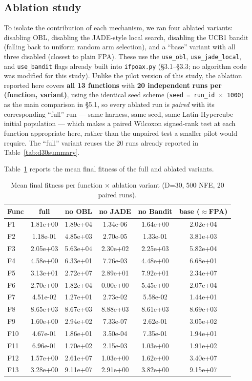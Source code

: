 \documentclass[preprint,12pt]{elsarticle}
\begin{document}
\subsection{Ablation study}
\label{subsec5-4}
To isolate the contribution of each mechanism, we ran four ablated variants: disabling OBL, disabling the JADE-style local search, disabling the UCB1 bandit (falling back to uniform random arm selection), and a ``base'' variant with all three disabled (closest to plain FPA). These use the \texttt{use\_obl}, \texttt{use\_jade\_local}, and \texttt{use\_bandit} flags already built into \texttt{ifpoax.py} (\S3.1--\S3.3; no algorithm code was modified for this study). Unlike the pilot version of this study, the ablation reported here covers \textbf{all 13 functions} with \textbf{20 independent runs per (function, variant)}, using the identical seed scheme (\texttt{seed = run\_id $\times$ 1000}) as the main comparison in \S5.1, so every ablated run is \emph{paired} with its corresponding ``full'' run --- same harness, same seed, same Latin-Hypercube initial population --- which makes a paired Wilcoxon signed-rank test at each function appropriate here, rather than the unpaired test a smaller pilot would require. The ``full'' variant reuses the 20 runs already reported in Table~\ref{tab:d30summary}.

Table~\ref{tab:ablation} reports the mean final fitness of the full and ablated variants.

\begin{table}[htbp]
\centering
\footnotesize
\caption{Mean final fitness per function $\times$ ablation variant (D=30, 500 NFE, 20 paired runs).}
\label{tab:ablation}
\begin{tabular}{lccccc}
\hline
Func & full & no OBL & no JADE & no Bandit & base ($\approx$FPA) \\
\hline
F1  & 1.81e+00 & 1.89e+04 & 1.34e-06 & 1.64e+00 & 2.02e+04 \\
F2  & 1.18e-01 & 4.85e+03 & 2.70e-05 & 1.33e-01 & 3.81e+03 \\
F3  & 2.05e+03 & 5.63e+04 & 2.30e+02 & 2.25e+03 & 5.82e+04 \\
F4  & 4.58e+00 & 6.33e+01 & 7.76e-03 & 4.48e+00 & 6.68e+01 \\
F5  & 3.13e+01 & 2.72e+07 & 2.89e+01 & 7.92e+01 & 2.34e+07 \\
F6  & 2.70e+00 & 1.82e+04 & 0.00e+00 & 5.45e+00 & 2.07e+04 \\
F7  & 4.51e-02 & 1.27e+01 & 2.73e-02 & 5.58e-02 & 1.44e+01 \\
F8  & 8.65e+03 & 8.67e+03 & 8.88e+03 & 8.61e+03 & 8.69e+03 \\
F9  & 1.60e+00 & 2.94e+02 & 7.33e-07 & 2.62e-01 & 3.05e+02 \\
F10 & 4.67e-01 & 1.86e+01 & 3.50e-04 & 7.35e-01 & 1.94e+01 \\
F11 & 6.96e-01 & 1.70e+02 & 2.15e-03 & 1.03e+00 & 1.91e+02 \\
F12 & 1.57e+00 & 2.61e+07 & 1.03e+00 & 1.62e+00 & 3.40e+07 \\
F13 & 3.28e+00 & 9.11e+07 & 2.91e+00 & 3.82e+00 & 9.15e+07 \\
\hline
\end{tabular}
\end{table}
\end{document}
